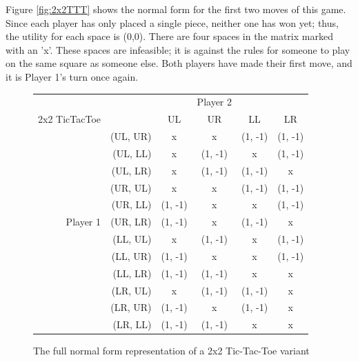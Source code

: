 Figure \ref{fig:2x2TTT} shows the normal form for the first two moves of this game. Since each player has only placed a single piece, neither one has won yet; thus, the utility for each space is (0,0). There are four spaces in the matrix marked with an 'x'. These spaces are infeasible; it is against the rules for someone to play on the same square as someone else. Both players have made their first move, and it is Player 1's turn once again.\\
\begin{figure}[H]
  \centering
  \begin{tabular}{r r | c | c | c | c |}
    &\multicolumn{1}{c}{}&\multicolumn{1}{c}{}&\multicolumn{1}{c}{Player 2}&\multicolumn{1}{c}{}\\
    \multicolumn{1}{c}{2x2 TicTacToe}&\multicolumn{1}{c}{}&\multicolumn{1}{c}{UL}&
    \multicolumn{1}{c}{UR}&\multicolumn{1}{c}{LL}&\multicolumn{1}{c}{LR}\\ \cline{3-6}
    & (UL, UR) & x & x & (1, -1) & (1, -1) \\ \cline{3-6}
    & (UL, LL) & x & (1, -1) & x & (1, -1) \\ \cline{3-6}
    & (UL, LR) & x & (1, -1) & (1, -1) & x \\ \cline{3-6}
    & (UR, UL) & x & x & (1, -1) & (1, -1) \\ \cline{3-6}
    & (UR, LL) & (1, -1) & x & x & (1, -1) \\ \cline{3-6}
    Player 1 & (UR, LR) & (1, -1) & x & (1, -1) & x \\ \cline{3-6}
    & (LL, UL) & x & (1, -1) & x & (1, -1) \\ \cline{3-6}
    & (LL, UR) & (1, -1) & x & x & (1, -1) \\ \cline{3-6}
    & (LL, LR) & (1, -1) & (1, -1) & x & x \\ \cline{3-6}
    & (LR, UL) & x & (1, -1) & (1, -1) & x \\ \cline{3-6}
    & (LR, UR) & (1, -1) & x & (1, -1) & x \\ \cline{3-6}
    & (LR, LL) & (1, -1) & (1, -1) & x & x \\ \cline{3-6}
  \end{tabular}
  \caption{The full normal form representation of a 2x2 Tic-Tac-Toe variant}
  \label{fig:full2x2TTT}
\end{figure}

